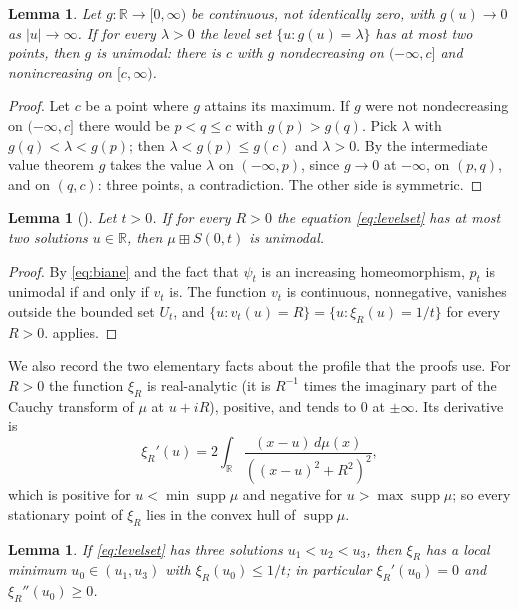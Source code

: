\documentclass[11pt]{amsart}
\newtheorem{lemma}[theorem]{Lemma}
\theoremstyle{definition}
\newcommand{\R}{\mathbb{R}}
\newcommand{\bp}{\boxplus}
\newcommand{\supp}{\operatorname{supp}}
\begin{document}
\begin{lemma}\label{lem:unimodal}
Let $g:\R\to[0,\infty)$ be continuous, not identically zero, with $g(u)\to 0$ as $|u|\to\infty$. If for every $\lambda>0$ the level set $\{u: g(u)=\lambda\}$ has at most two points, then $g$ is unimodal: there is $c$ with $g$ nondecreasing on $(-\infty,c]$ and nonincreasing on $[c,\infty)$.
\end{lemma}

\begin{proof}
Let $c$ be a point where $g$ attains its maximum. If $g$ were not nondecreasing on $(-\infty,c]$ there would be $p<q\le c$ with $g(p)>g(q)$. Pick $\lambda$ with $g(q)<\lambda<g(p)$; then $\lambda<g(p)\le g(c)$ and $\lambda>0$. By the intermediate value theorem $g$ takes the value $\lambda$ on $(-\infty,p)$, since $g\to0$ at $-\infty$, on $(p,q)$, and on $(q,c)$: three points, a contradiction. The other side is symmetric.
\end{proof}

\begin{lemma}[{\cite[Lemma 3.1]{HasebeUeda}}]\label{lem:HU}
Let $t>0$. If for every $R>0$ the equation \eqref{eq:levelset} has at most two solutions $u\in\R$, then $\mu\bp S(0,t)$ is unimodal.
\end{lemma}

\begin{proof}
By \eqref{eq:biane} and the fact that $\psi_t$ is an increasing homeomorphism, $p_t$ is unimodal if and only if $v_t$ is. The function $v_t$ is continuous, nonnegative, vanishes outside the bounded set $U_t$, and $\{u: v_t(u)=R\}=\{u:\xi_R(u)=1/t\}$ for every $R>0$.  applies.
\end{proof}

We also record the two elementary facts about the profile that the proofs use. For $R>0$ the function $\xi_R$ is real-analytic (it is $R^{-1}$ times the imaginary part of the Cauchy transform of $\mu$ at $u+iR$), positive, and tends to $0$ at $\pm\infty$. Its derivative is
\begin{equation}\label{eq:xiprime}
\xi_R'(u)=2\int_\R\frac{(x-u)\,d\mu(x)}{((x-u)^2+R^2)^2},
\end{equation}
which is positive for $u<\min\supp\mu$ and negative for $u>\max\supp\mu$; so every stationary point of $\xi_R$ lies in the convex hull of $\supp\mu$.

\begin{lemma}\label{lem:threesol}
If \eqref{eq:levelset} has three solutions $u_1<u_2<u_3$, then $\xi_R$ has a local minimum $u_0\in(u_1,u_3)$ with $\xi_R(u_0)\le 1/t$; in particular $\xi_R'(u_0)=0$ and $\xi_R''(u_0)\ge0$.
\end{lemma}
\end{document}
